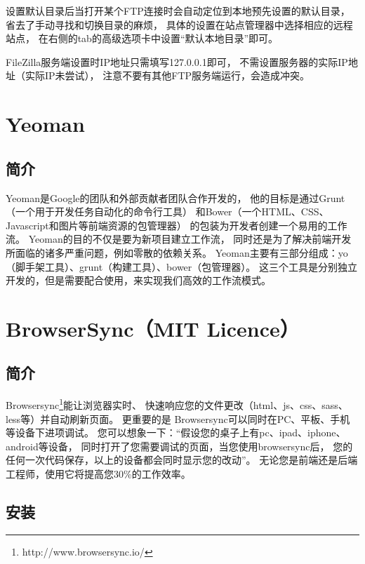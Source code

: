 \documentclass{book}
\begin{document}
设置默认目录后当打开某个FTP连接时会自动定位到本地预先设置的默认目录，
省去了手动寻找和切换目录的麻烦，
具体的设置在站点管理器中选择相应的远程站点，
在右侧的tab的高级选项卡中设置“默认本地目录”即可。

FileZilla服务端设置时IP地址只需填写127.0.0.1即可，
不需设置服务器的实际IP地址（实际IP未尝试），
注意不要有其他FTP服务端运行，会造成冲突。





\section{Yeoman}

\subsection{简介}

Yeoman是Google的团队和外部贡献者团队合作开发的，
他的目标是通过Grunt（一个用于开发任务自动化的命令行工具）
和Bower（一个HTML、CSS、Javascript和图片等前端资源的包管理器）
的包装为开发者创建一个易用的工作流。
Yeoman的目的不仅是要为新项目建立工作流，
同时还是为了解决前端开发所面临的诸多严重问题，例如零散的依赖关系。
Yeoman主要有三部分组成：yo（脚手架工具）、grunt（构建工具）、bower（包管理器）。
这三个工具是分别独立开发的，但是需要配合使用，来实现我们高效的工作流模式。 

\section{BrowserSync（MIT Licence）}

\subsection{简介}

Browsersync\footnote{http://www.browsersync.io/}能让浏览器实时、
快速响应您的文件更改（html、js、css、sass、less等）并自动刷新页面。
更重要的是 Browsersync可以同时在PC、平板、手机等设备下进项调试。
您可以想象一下：“假设您的桌子上有pc、ipad、iphone、android等设备，
同时打开了您需要调试的页面，当您使用browsersync后，
您的任何一次代码保存，以上的设备都会同时显示您的改动”。
无论您是前端还是后端工程师，使用它将提高您30\%的工作效率。 

\subsection{安装}
\end{document}
